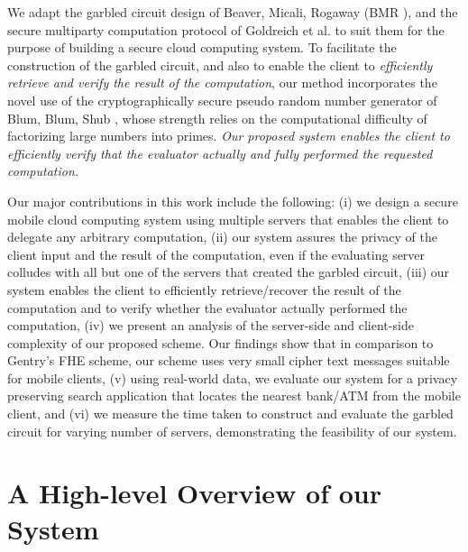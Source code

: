 \documentclass[10pt,journal,cspaper,compsoc]{IEEEtran}
\begin{document}
We adapt the garbled circuit design of Beaver, Micali, Rogaway (BMR \cite{beaver90,rogaway91}), and the secure multiparty computation protocol of Goldreich et al. \cite{goldreich04,goldreich87} to suit them for the purpose of building a secure cloud computing system. To facilitate the construction of the garbled circuit, and also to enable the client to {\em efficiently retrieve and verify the result of the computation}, our method incorporates the novel use of the cryptographically secure pseudo random number generator of Blum, Blum, Shub \cite{blum86,schneier95}, whose strength relies on the computational difficulty of factorizing large numbers into primes. {\em Our proposed system enables the client to efficiently verify that the evaluator actually and fully performed the requested computation.}


Our major contributions in this work include the following: (i) we design a secure mobile cloud computing system using multiple servers that enables the client to delegate any arbitrary computation, (ii) our system assures the privacy of the client input and the result of the computation, even if the evaluating server colludes with all but one of the servers that created the garbled circuit, (iii) our system enables the client to efficiently retrieve/recover the result of the computation and to verify whether the evaluator actually performed the computation, (iv) we present an analysis of the server-side and client-side complexity of our proposed scheme. Our findings show that in comparison to Gentry's FHE scheme, our scheme uses very small cipher text messages suitable for mobile clients, (v) using real-world data, we evaluate our system for a privacy preserving search application that locates the nearest bank/ATM from the mobile client, and (vi) we measure the time taken to construct and evaluate the garbled circuit for varying number of servers, demonstrating the feasibility of our system.\vspace{-2 mm}


 \section{A High-level Overview of our\\ System}
\end{document}

